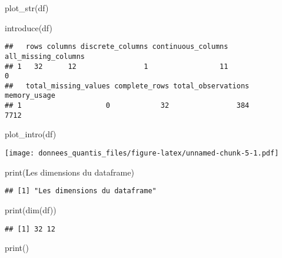 \documentclass[
]{article}
\newenvironment{Shaded}{\begin{snugshade}}{\end{snugshade}}
\newcommand{\FunctionTok}[1]{\textcolor[rgb]{0.00,0.00,0.00}{#1}}
\newcommand{\NormalTok}[1]{#1}
\newcommand{\StringTok}[1]{\textcolor[rgb]{0.31,0.60,0.02}{#1}}
\begin{document}
\begin{Shaded}
\begin{Highlighting}[]
\FunctionTok{plot\_str}\NormalTok{(df)}
\end{Highlighting}
\end{Shaded}

\begin{Shaded}
\begin{Highlighting}[]
\FunctionTok{introduce}\NormalTok{(df)}
\end{Highlighting}
\end{Shaded}

\begin{verbatim}
##   rows columns discrete_columns continuous_columns all_missing_columns
## 1   32      12                1                 11                   0
##   total_missing_values complete_rows total_observations memory_usage
## 1                    0            32                384         7712
\end{verbatim}

\begin{Shaded}
\begin{Highlighting}[]
\FunctionTok{plot\_intro}\NormalTok{(df)}
\end{Highlighting}
\end{Shaded}

\texttt{[image: donnees\_quantis\_files/figure-latex/unnamed-chunk-5-1.pdf]}

\begin{Shaded}
\begin{Highlighting}[]
\FunctionTok{print}\NormalTok{(}\StringTok{\textquotesingle{}Les dimensions du dataframe\textquotesingle{}}\NormalTok{)}
\end{Highlighting}
\end{Shaded}

\begin{verbatim}
## [1] "Les dimensions du dataframe"
\end{verbatim}

\begin{Shaded}
\begin{Highlighting}[]
\FunctionTok{print}\NormalTok{(}\FunctionTok{dim}\NormalTok{(df))}
\end{Highlighting}
\end{Shaded}

\begin{verbatim}
## [1] 32 12
\end{verbatim}

\begin{Shaded}
\begin{Highlighting}[]
\FunctionTok{print}\NormalTok{(}\StringTok{\textquotesingle{}{-}{-}{-}{-}{-}{-}{-}{-}{-}{-}{-}{-}{-}{-}{-}{-}{-}{-}{-}{-}{-}{-}{-}{-}{-}{-}{-}{-}\textquotesingle{}}\NormalTok{)}
\end{Highlighting}
\end{Shaded}
\end{document}
